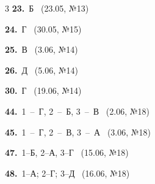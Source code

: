\documentclass[12pt]{article}
\begin{document}
\ifshowsolutions
{}
\begin{multicols}{3}\noindent
\noindent\textbf{23.}~Б \ {\scriptsize\color{gray}(23.05, №13)}\par
\noindent\textbf{24.}~Г \ {\scriptsize\color{gray}(30.05, №15)}\par
\noindent\textbf{25.}~В \ {\scriptsize\color{gray}(3.06, №14)}\par
\noindent\textbf{26.}~Д \ {\scriptsize\color{gray}(5.06, №14)}\par
\noindent\textbf{30.}~Г \ {\scriptsize\color{gray}(19.06, №14)}\par
\noindent\textbf{44.}~1~--~Г, 2~--~Б, 3~--~В \ {\scriptsize\color{gray}(2.06, №18)}\par
\noindent\textbf{45.}~1~--~Г, 2~--~В, 3~--~А \ {\scriptsize\color{gray}(3.06, №18)}\par
\noindent\textbf{47.}~1--Б, 2--А, 3--Г \ {\scriptsize\color{gray}(15.06, №18)}\par
\noindent\textbf{48.}~1--А; 2--Г; 3--Д \ {\scriptsize\color{gray}(16.06, №18)}\par
\end{multicols}
\fi

\endgroup
\end{document}
